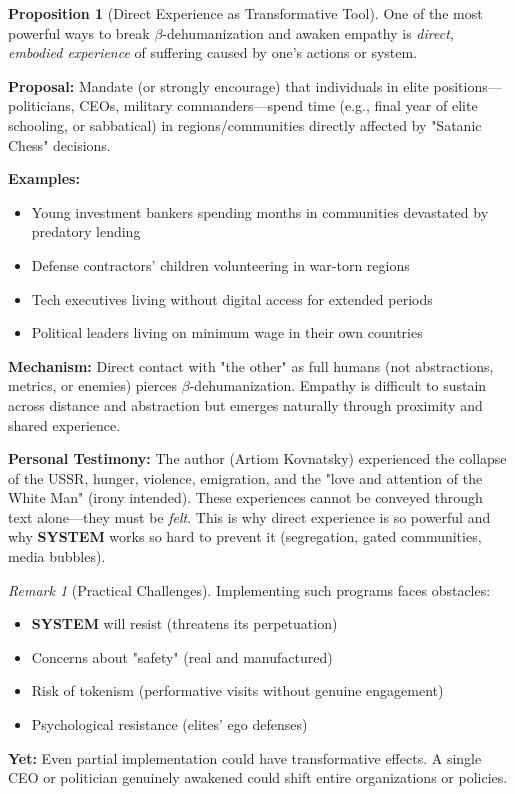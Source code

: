 \documentclass[11pt,a4paper]{article}
\newcommand{\SYSTEM}{\textbf{SYSTEM}}
\newcommand{\betaDehum}{$\beta$-dehumanization}
\theoremstyle{definition}
\newtheorem{proposition}{Proposition}[section]
\theoremstyle{remark}
\newtheorem{remark}{Remark}[section]
\begin{document}
\begin{proposition}[Direct Experience as Transformative Tool]
\label{prop:direct_experience}
One of the most powerful ways to break \betaDehum{} and awaken empathy is \textit{direct, embodied experience} of suffering caused by one's actions or system.

\textbf{Proposal:} Mandate (or strongly encourage) that individuals in elite positions—politicians, CEOs, military commanders—spend time (e.g., final year of elite schooling, or sabbatical) in regions/communities directly affected by "Satanic Chess" decisions.

\textbf{Examples:}
\begin{itemize}
\item Young investment bankers spending months in communities devastated by predatory lending
\item Defense contractors' children volunteering in war-torn regions
\item Tech executives living without digital access for extended periods
\item Political leaders living on minimum wage in their own countries
\end{itemize}

\textbf{Mechanism:} Direct contact with "the other" as full humans (not abstractions, metrics, or enemies) pierces \betaDehum{}. Empathy is difficult to sustain across distance and abstraction but emerges naturally through proximity and shared experience.

\textbf{Personal Testimony:} The author (Artiom Kovnatsky) experienced the collapse of the USSR, hunger, violence, emigration, and the "love and attention of the White Man" (irony intended). These experiences cannot be conveyed through text alone—they must be \textit{felt}. This is why direct experience is so powerful and why \SYSTEM{} works so hard to prevent it (segregation, gated communities, media bubbles).
\end{proposition}

\begin{remark}[Practical Challenges]
Implementing such programs faces obstacles:
\begin{itemize}
\item \SYSTEM{} will resist (threatens its perpetuation)
\item Concerns about "safety" (real and manufactured)
\item Risk of tokenism (performative visits without genuine engagement)
\item Psychological resistance (elites' ego defenses)
\end{itemize}

\textbf{Yet:} Even partial implementation could have transformative effects. A single CEO or politician genuinely awakened could shift entire organizations or policies.
\end{remark}
\end{document}
